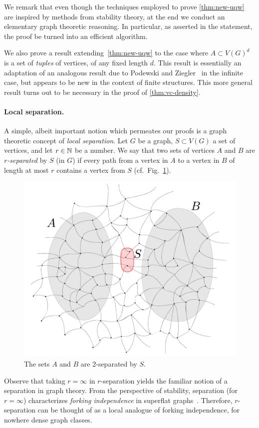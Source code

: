 We remark
that even though the techniques employed to prove \cref{thm:new-uqw} are inspired by methods from stability theory, 
at the end we conduct an elementary graph theoretic reasoning. In particular, as asserted in the statement, the
proof be turned into an efficient algorithm.

We also prove a result extending~\cref{thm:new-uqw}
to the case where $A\subset V(G)^d$ is a set of \emph{tuples} of vertices, of any fixed length $d$.
This result is essentially an adaptation of an analogous result due to Podewski and Ziegler~\cite{podewski1978stable} in the infinite case,
but appears to be new in the context of finite structures.
This more general result turns out to be necessary in the proof of \cref{thm:vc-density}.

\paragraph{Local separation.}
A simple, albeit important notion which permeates our proofs
is a graph theoretic concept of \emph{local separation}.
Let $G$ be a graph, $S\subset V(G)$ a set of vertices,
and let $r\in \mathbb{N}$ be a number. We say that two  sets of vertices $A$ and $B$  are \emph{$r$-separated} by $S$ (in $G$) if every path from a vertex in $A$ to a vertex in $B$
of length at most $r$ contains a vertex from $S$ (cf.~Fig.~\ref{fig:sep}).
 \begin{figure}[h!]
 	\centering
 		\includegraphics[scale=0.3,page=1]{pics}
 	\caption{The sets $A$ and $B$ are $2$-separated by $S$.
 	}
 	\label{fig:sep}
 \end{figure}
Observe that taking $r=\infty$ in $r$-separation yields the familiar notion of a separation in graph theory.
From the perspective of stability, separation (for $r=\infty$) characterizes \emph{forking independence} in superflat graphs~\cite{ivanov}. Therefore,
$r$-separation can be thought of as a local analogue of forking independence, for nowhere dense graph classes.

